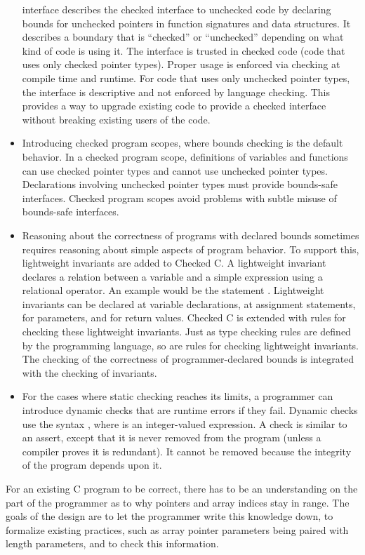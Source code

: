 \begin{itemize}
  interface describes the checked interface to unchecked code by declaring
  bounds for unchecked pointers in function signatures and data structures.
  It describes a boundary that is ``checked'' or ``unchecked''
  depending on what kind of code is using it. The
  interface is trusted in checked code (code that uses only checked pointer types).
  Proper usage is enforced via checking at compile time and runtime. For
  code that uses only unchecked pointer types, the interface is descriptive and
  not enforced by
  language checking. This provides a way to upgrade existing code to
  provide a checked interface without breaking existing users of the code.
\item
  Introducing checked program scopes, where bounds checking is the
  default behavior. In a checked program scope, definitions of variables
  and functions can use checked pointer types and cannot use unchecked pointer
  types. Declarations involving unchecked pointer types must provide
  bounds-safe interfaces. Checked program scopes avoid problems with
  subtle misuse of bounds-safe interfaces.
\item
  Reasoning about the correctness of programs with declared bounds
  sometimes requires reasoning about simple aspects of program behavior.
  To support this, lightweight invariants are added to Checked C. A lightweight
  invariant declares a relation between a variable and a simple
  expression using a relational operator. An example would be the
  statement . Lightweight invariants can be
  declared at variable declarations, at assignment statements, for
  parameters, and for return values. Checked C is extended with rules for
  checking these lightweight invariants. Just as type checking rules are
  defined by the programming language, so are rules for checking
  lightweight invariants. The checking of the correctness of
  programmer-declared bounds is integrated with the checking of
  invariants.
\item
  For the cases where static checking reaches its limits, a programmer
  can introduce dynamic checks that are runtime errors if they fail.
  Dynamic checks use the syntax  , where  is an
  integer-valued expression. A check is similar to an assert, except
  that it is never removed from the program (unless a compiler proves
  it is redundant). It cannot be removed because the integrity of the
  program depends upon it.
\end{itemize}

For an existing C program to be correct, there has to be an
understanding on the part of the programmer as to why pointers and array
indices stay in range. The goals of the design are to let the programmer
write this knowledge down, to formalize existing practices, such as
array pointer parameters being paired with length parameters, and to
check this information.

